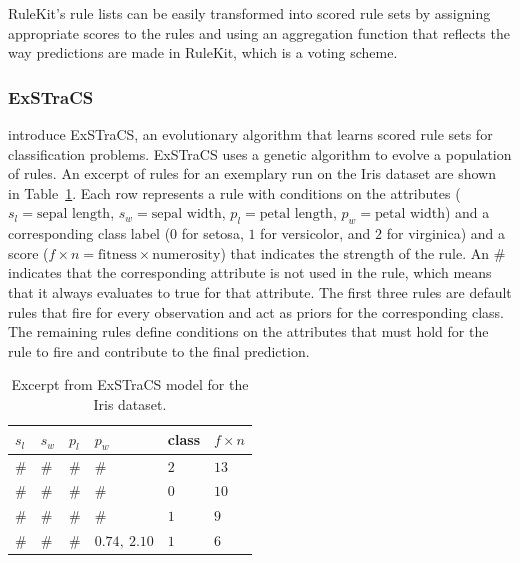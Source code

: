 \documentclass[a4paper,twoside]{article}
\begin{document}
RuleKit's rule lists can be easily transformed into scored rule sets by assigning appropriate scores to the rules and using an aggregation function that reflects the way predictions are made in RuleKit, which is a voting scheme. 

\subsubsection{ExSTraCS} 

\citet{urbanowicz_exstracs_2015} introduce ExSTraCS, an evolutionary algorithm that learns scored rule sets for classification problems. ExSTraCS uses a genetic algorithm to evolve a population of rules. An excerpt of rules for an exemplary run on the Iris dataset are shown in Table~\ref{tab:exstracs_iris_example}. Each row represents a rule with conditions on the attributes ($s_l=\text{sepal length}$, $s_w=\text{sepal width}$, $p_l=\text{petal length}$, $p_w=\text{petal width}$) and a corresponding class label ($0$ for setosa, $1$ for versicolor, and $2$ for virginica) and a score ($f\times n = \text{fitness} \times \text{numerosity}$) that indicates the strength of the rule. An $\#$ indicates that the corresponding attribute is not used in the rule, which means that it always evaluates to true for that attribute. The first three rules are default rules that fire for every observation and act as priors for the corresponding class. The remaining rules define conditions on the attributes that must hold for the rule to fire and contribute to the final prediction.

\begin{table}
   \centering
  \caption{Excerpt from ExSTraCS model for the Iris dataset.}
   \label{tab:exstracs_iris_example}
   \begin{tabular}{p{0.6cm} p{0.6cm} p{0.6cm} p{1.3cm} p{0.8cm} p{0.8cm}}
      \toprule
      $s_l$ & $s_w$ & $p_l$ & $p_w$ & class & $f\times n$ \\
      \midrule
    \# & \# & \# & \# & $2$ & $13$ \\
    \# & \# & \# & \# & $0$ & $10$ \\
    \# & \# & \# & \# & $1$ & $9$ \\
    \# & \# & \# & $0.74,\ 2.10$ & $1$ & $6$ \\
      \bottomrule
   \end{tabular}
\end{table}
\end{document}
